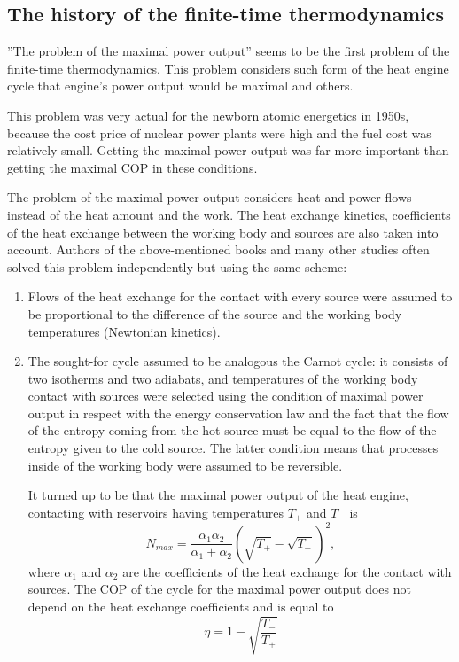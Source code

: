\documentclass[epjST]{svjour}
\begin{document}
\subsection*{The history of the finite-time thermodynamics}
''The problem of the maximal power output'' seems to be the first problem of the finite-time thermodynamics. This problem considers such form of the heat engine cycle that engine's power output would be maximal\cite{Nov}\cite{CurAhl} and others.

This problem was very actual for the newborn atomic energetics in 1950s, because the cost price of nuclear power plants were high and the fuel cost was relatively small. Getting the maximal power output was far more important than getting the maximal COP in these conditions.

The problem of the maximal power output considers heat and power flows instead of the heat amount and the work. The heat exchange kinetics, coefficients of the heat exchange between the working body and sources are also taken into account. Authors of the above-mentioned books and many other studies often solved this problem independently but using the same scheme:

\begin{enumerate}
\item Flows of the heat exchange for the contact with every source were assumed to be proportional to the difference of the source and the working body temperatures (Newtonian kinetics).
\item The sought-for cycle assumed to be analogous the Carnot cycle: it consists of two isotherms and two adiabats, and temperatures of the working body contact with sources were selected using the condition of maximal power output in respect with the energy conservation law and the fact that the flow of the entropy coming from the hot source must be equal to the flow of the entropy given to the cold source. The latter condition means that processes inside of the working body were assumed to be reversible.

It turned up to be that the maximal power output of the heat engine, contacting with reservoirs having temperatures $T_+$ and $T_-$ is
\begin{equation}
N_{max} = \frac{\alpha_1\alpha_2}{\alpha_1+\alpha_2}\left(\sqrt{T_+}-\sqrt{T_-}\right)^2,
\end{equation}
where $\alpha_1$ and $\alpha_2$ are the coefficients of the heat exchange for the contact with sources. The COP of the cycle for the maximal power output does not depend on the heat exchange coefficients and is equal to
\begin{equation}
\eta = 1 - \sqrt{\frac{T_-}{T_+}}
\end{equation}

\end{enumerate}
\end{document}
